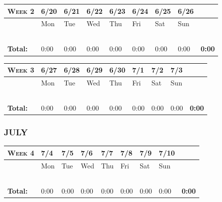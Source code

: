 \documentclass{article}
\begin{document}
\vspace{0.2in}

\begin{tabular}{ |m{1cm}||m{1cm}|m{1cm}|m{1cm}|m{1cm}|m{1cm}|m{1cm}|m{1cm}||m{1cm}|} 
\hline
\textsc{Week 2} & 6/20 & 6/21 & 6/22 & 6/23 & 6/24 & 6/25 & 6/26 & \\ 
\hline
\rowcolor{lightgray} 
\cellcolor{white} & Mon & Tue & Wed & Thu & Fri & Sat & Sun & \cellcolor{white}\\ 
\hline
\hline
 & & & & & & & & \\ 
\hline
 & & & & & & & & \\ 
\hline
 & & & & & & & & \\ 
\hline
 & & & & & & & & \\ 
\hline
 & & & & & & & & \\ 
\hline
\textbf{Total:} & 0:00 & 0:00 & 0:00 & 0:00 & 0:00 & 0:00 & 0:00 & \textbf{0:00} \\
\hline
\end{tabular}

\vspace{0.2in}

\begin{tabular}{ |m{1cm}||m{1cm}|m{1cm}|m{1cm}|m{1cm}|m{1cm}|m{1cm}|m{1cm}||m{1cm}|} 
\hline
\textsc{Week 3} & 6/27 & 6/28 & 6/29 & 6/30 & 7/1 & 7/2 & 7/3 & \\ 
\hline
\rowcolor{lightgray} 
\cellcolor{white} & Mon & Tue & Wed & Thu & Fri & Sat & Sun & \cellcolor{white}\\ 
\hline
\hline
 & & & & & & & & \\ 
\hline
 & & & & & & & & \\ 
\hline
 & & & & & & & & \\ 
\hline
 & & & & & & & & \\ 
\hline
 & & & & & & & & \\ 
\hline
\textbf{Total:} & 0:00 & 0:00 & 0:00 & 0:00 & 0:00 & 0:00 & 0:00 & \textbf{0:00} \\
\hline
\end{tabular}

\flushleft\subsubsection*{JULY}

\begin{tabular}{ |m{1cm}||m{1cm}|m{1cm}|m{1cm}|m{1cm}|m{1cm}|m{1cm}|m{1cm}||m{1cm}|} 
\hline
\textsc{Week 4} & 7/4 & 7/5 & 7/6 & 7/7 & 7/8 & 7/9 & 7/10 & \\ 
\hline
\rowcolor{lightgray} 
\cellcolor{white} & Mon & Tue & Wed & Thu & Fri & Sat & Sun & \cellcolor{white}\\ 
\hline
\hline
 & & & & & & & & \\ 
\hline
 & & & & & & & & \\ 
\hline
 & & & & & & & & \\ 
\hline
 & & & & & & & & \\ 
\hline
 & & & & & & & & \\ 
\hline
\textbf{Total:} & 0:00 & 0:00 & 0:00 & 0:00 & 0:00 & 0:00 & 0:00 & \textbf{0:00} \\
\hline
\end{tabular}
\end{document}

